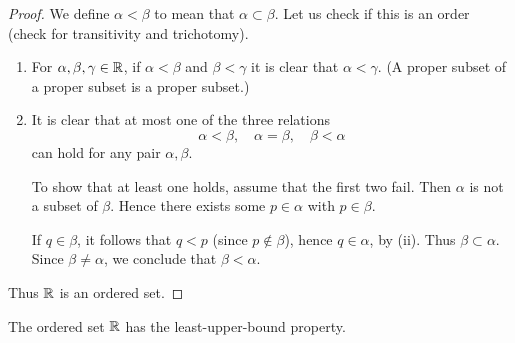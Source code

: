 \begin{proof}
We define $\alpha<\beta$ to mean that $\alpha\subset\beta$. Let us check if this is an order (check for transitivity and trichotomy).
\begin{enumerate}[label=(\arabic*)]
\item For $\alpha,\beta,\gamma\in\mathbb R$, if $\alpha<\beta$ and $\beta<\gamma$ it is clear that $\alpha<\gamma$. (A proper subset of a proper subset is a proper subset.)

\item It is clear that at most one of the three relations
\[ \alpha<\beta, \quad \alpha=\beta, \quad \beta<\alpha \]
can hold for any pair $\alpha,\beta$. 

To show that at least one holds, assume that the first two fail. Then $\alpha$ is not a subset of $\beta$. Hence there exists some $p\in\alpha$ with $p\in\beta$.

If $q\in\beta$, it follows that $q<p$ (since $p\notin\beta$), hence $q\in\alpha$, by (ii). Thus $\beta\subset\alpha$. Since $\beta\neq\alpha$, we conclude that $\beta<\alpha$.
\end{enumerate}
Thus $\mathbb R$ is an ordered set.
\end{proof}

\begin{proposition}
The ordered set $\mathbb R$ has the least-upper-bound property.
\end{proposition}

